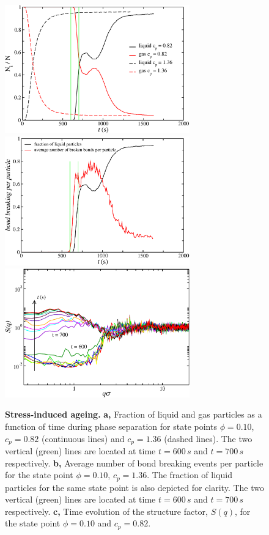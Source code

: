 \documentclass[a4paper,preprint,superscriptaddress]{revtex4}
\begin{document}
\begin{figure}[!t]
 \centering
 \includegraphics[width=8cm]{fig2a}
  \includegraphics[width=8cm]{fig2b}
  \includegraphics[width=8cm]{fig2c}
 \caption{{\bf Stress-induced ageing.} {\bf a,} Fraction of liquid and gas particles as a function of time during phase separation for state points
 $\phi=0.10$, $c_p=0.82$ (continuous lines) and $c_p=1.36$ (dashed lines). The two vertical (green) lines are located at time $t=600\,s$ and $t=700\,s$
 respectively. {\bf b,} Average number of bond breaking events
 per particle for the state point $\phi=0.10$, $c_p=1.36$. The fraction of liquid particles for the same state point
 is also depicted for clarity. The two vertical (green) lines are located at time $t=600\,s$ and $t=700\,s$
 respectively.
{\bf c,} Time evolution of the structure factor, $S(q)$, for the state point $\phi=0.10$ and $c_p=0.82$.}
 \label{fig:stress}
\end{figure}
\end{document}
